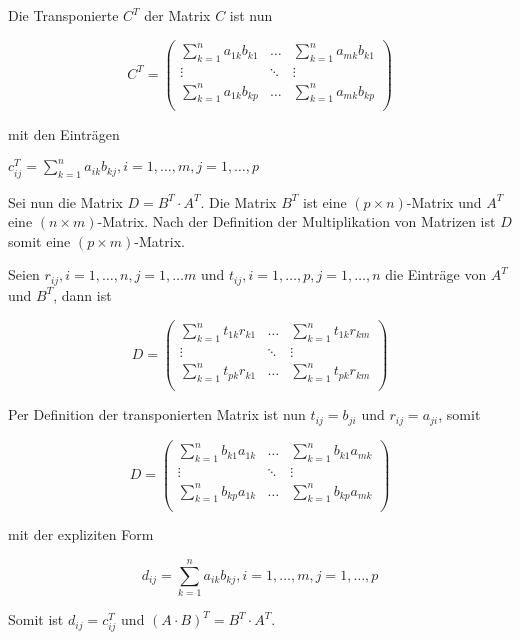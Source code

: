 \documentclass{article}
\begin{document}
\begin{enumerate}[(i)]
  Die Transponierte $C^T$ der Matrix $C$ ist nun
  
  \[
    C^T = \begin{pmatrix}
      \sum\limits_{k=1}^n a_{1k}b_{k1} & \ldots & \sum\limits_{k=1}^n a_{mk}b_{k1} \\
      \vdots                         & \ddots & \vdots \\
      \sum\limits_{k=1}^n a_{1k}b_{kp} & \ldots & \sum\limits_{k=1}^n a_{mk}b_{kp} \\
    \end{pmatrix}
  \]

  mit den Einträgen  
  
  $c_{ij}^T = \sum\limits_{k=1}^n a_{ik}b_{kj}, i = 1, \ldots, m, j = 1, \ldots, p$

  Sei nun die Matrix $D = B^T \cdot A^T$. Die Matrix $B^T$ ist eine $(p \times n)$-Matrix und
  $A^T$ eine $(n \times m)$-Matrix. Nach der Definition der Multiplikation von Matrizen ist
  $D$ somit eine $(p \times m)$-Matrix.

  Seien $r_{ij}, i = 1, \ldots, n, j = 1, \ldots m$ und $t_{ij}, i = 1, \ldots, p, j = 1, \ldots, n$
  die Einträge von $A^T$ und $B^T$, dann ist

  \[
    D = \begin{pmatrix}
      \sum\limits_{k=1}^n t_{1k}r_{k1} & \ldots & \sum\limits_{k=1}^n t_{1k}r_{km} \\
      \vdots                         & \ddots & \vdots \\
      \sum\limits_{k=1}^n t_{pk}r_{k1} & \ldots & \sum\limits_{k=1}^n t_{pk}r_{km} \\
    \end{pmatrix}
  \]

  Per Definition der transponierten Matrix ist nun $t_{ij} = b_{ji}$ und $r_{ij} = a_{ji}$, somit

  \[
    D = \begin{pmatrix}
      \sum\limits_{k=1}^n b_{k1}a_{1k} & \ldots & \sum\limits_{k=1}^n b_{k1}a_{mk} \\
      \vdots                         & \ddots & \vdots \\
      \sum\limits_{k=1}^n b_{kp}a_{1k} & \ldots & \sum\limits_{k=1}^n b_{kp}a_{mk} \\
    \end{pmatrix}
  \]

  mit der expliziten Form

  \[
    d_{ij} = \sum\limits_{k=1}^n a_{ik}b_{kj}, i = 1, \ldots, m, j = 1, \ldots, p
  \]

  Somit ist $d_{ij} = c_{ij}^T$ und $(A \cdot B)^T = B^T \cdot A^T$.
\end{enumerate}
\end{document}
